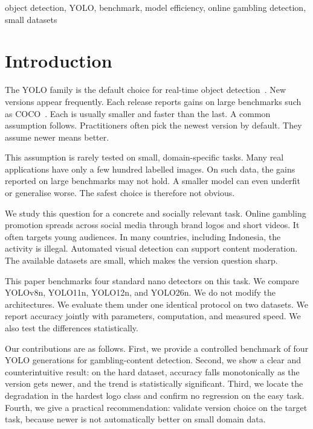 \documentclass[conference]{IEEEtran}
\begin{document}
\begin{IEEEkeywords}
object detection, YOLO, benchmark, model efficiency, online gambling
detection, small datasets
\end{IEEEkeywords}

\section{Introduction}
The YOLO family is the default choice for real-time object
detection~\cite{redmon2016you, jocher2023yolov8}. New versions appear
frequently. Each release reports gains on large benchmarks such as
COCO~\cite{lin2014microsoft}. Each is usually smaller and faster than the
last. A common assumption follows. Practitioners often pick the newest version
by default. They assume newer means better.

This assumption is rarely tested on small, domain-specific tasks. Many real
applications have only a few hundred labelled images. On such data, the gains
reported on large benchmarks may not hold. A smaller model can even underfit or
generalise worse. The safest choice is therefore not obvious.

We study this question for a concrete and socially relevant task. Online
gambling promotion spreads across social media through brand logos and short
videos. It often targets young audiences. In many countries, including
Indonesia, the activity is illegal. Automated visual detection can support
content moderation. The available datasets are small, which makes the version
question sharp.

This paper benchmarks four standard nano detectors on this task. We compare
YOLOv8n, YOLO11n, YOLO12n, and YOLO26n. We do not modify the architectures. We
evaluate them under one identical protocol on two datasets. We report accuracy
jointly with parameters, computation, and measured speed. We also test the
differences statistically.

Our contributions are as follows. First, we provide a controlled benchmark of
four YOLO generations for gambling-content detection. Second, we show a clear
and counterintuitive result: on the hard dataset, accuracy falls monotonically
as the version gets newer, and the trend is statistically significant. Third,
we locate the degradation in the hardest logo class and confirm no regression
on the easy task. Fourth, we give a practical recommendation: validate version
choice on the target task, because newer is not automatically better on small
domain data.
\end{document}
